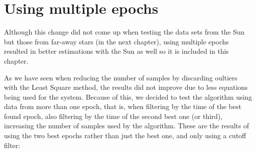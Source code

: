 \clearpage

\section{Using multiple epochs}

Although this change did not come up when testing the data sets from the Sun but those from far-away stars (in the next chapter), using multiple epochs resulted in better estimations with the Sun as well so it is included in this chapter.

As we have seen when reducing the number of samples by discarding oultiers with the Least Square method, the results did not improve due to less equations being used for the system. Because of this, we decided to test the algorithm using data from more than one epoch, that is, when filtering by the time of the best found epoch, also filtering by the time of the second best one (or third), increasing the number of samples used by the algorithm. These are the results of using the two best epochs rather than just the best one, and only using a cutoff filter:


